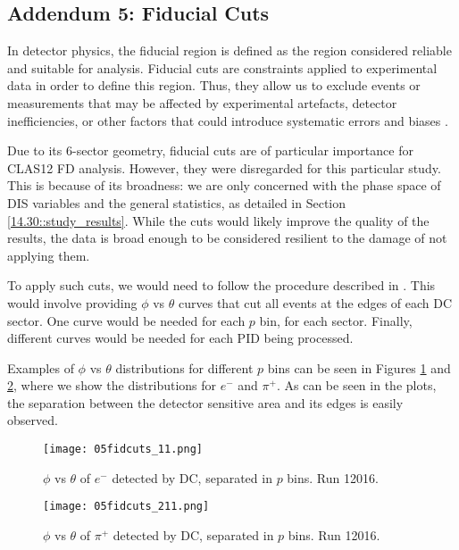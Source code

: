 \subsection*{Addendum 5: Fiducial Cuts}
    In detector physics, the fiducial region is defined as the region considered reliable and suitable for analysis.
    Fiducial cuts are constraints applied to experimental data in order to define this region.
    Thus, they allow us to exclude events or measurements that may be affected by experimental artefacts, detector inefficiencies, or other factors that could introduce systematic errors and biases \cite{leo1987}.

    Due to its 6-sector geometry, fiducial cuts are of particular importance for CLAS12 FD analysis.
    However, they were disregarded for this particular study.
    This is because of its broadness: we are only concerned with the phase space of DIS variables and the general statistics, as detailed in Section \ref{14.30::study_results}.
    While the cuts would likely improve the quality of the results, the data is broad enough to be considered resilient to the damage of not applying them.

    To apply such cuts, we would need to follow the procedure described in \cite{zana2010}.
    This would involve providing $\phi$ vs $\theta$ curves that cut all events at the edges of each DC sector.
    One curve would be needed for each $p$ bin, for each sector.
    Finally, different curves would be needed for each PID being processed.

    Examples of $\phi$ vs $\theta$ distributions for different $p$ bins can be seen in Figures \ref{fig::20.05::fiducial_cuts_pid11} and \ref{fig::20.05::fiducial_cuts_pid211}, where we show the distributions for $e^-$ and $\pi^+$.
    As can be seen in the plots, the separation between the detector sensitive area and its edges is easily observed.

    \begin{figure}
        \centering
        \texttt{[image: 05fidcuts\_11.png]}
        \caption[$\phi$ vs $\theta$ of $e^-$ in $p$ bins]
        {$\phi$ vs $\theta$ of $e^-$ detected by DC, separated in $p$ bins.
        Run 12016.}
        \label{fig::20.05::fiducial_cuts_pid11}
    \end{figure}

    \begin{figure}
        \centering
        \texttt{[image: 05fidcuts\_211.png]}
        \caption[$\phi$ vs $\theta$ of $\pi^+$ in $p$ bins]
        {$\phi$ vs $\theta$ of $\pi^+$ detected by DC, separated in $p$ bins.
        Run 12016.}
        \label{fig::20.05::fiducial_cuts_pid211}
    \end{figure}
